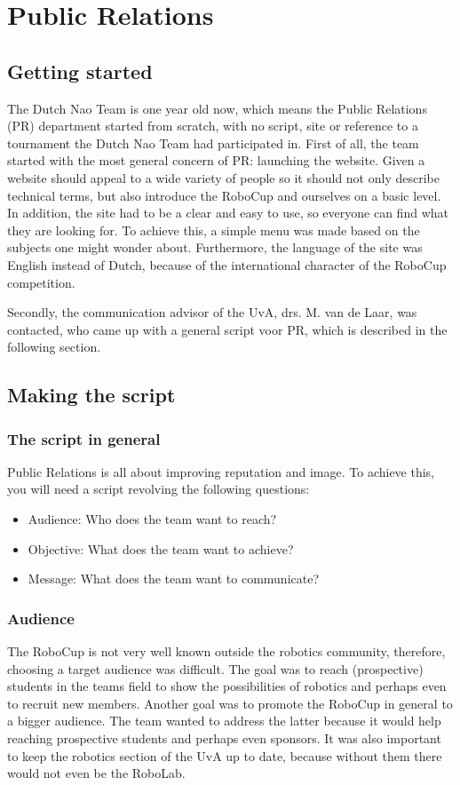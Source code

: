 \documentclass[11pt,a4paper,oneside]{article}
\begin{document}
\section{Public Relations}
\subsection{Getting started}
The Dutch Nao Team is one year old now, which means the Public Relations (PR) department started from scratch, with no script, site or reference to a tournament the Dutch Nao Team had participated in. First of all, the team started with the most general concern of PR: launching the website. Given a website should appeal to a wide variety of people so it should not only describe technical terms, but also introduce the RoboCup and ourselves on a basic level. In addition, the site had to be a clear and easy to use, so everyone can find what they are looking for. To achieve this, a simple menu was made based on the subjects one might wonder about. Furthermore, the language of the site was English instead of Dutch, because of the international character of the RoboCup competition.

Secondly, the communication advisor of the UvA, drs. M. van de Laar, was contacted, who came up with a general script voor PR, which is described in the following section.

\subsection{Making the script}
\subsubsection{The script in general}
Public Relations is all about improving reputation and image. To achieve this, you will need a script revolving the following questions:
\begin{itemize}
\item Audience: Who does the team want to reach?
\item Objective: What does the team want to achieve?
\item Message: What does the team want to communicate?
\end{itemize}

\subsubsection{Audience}
The RoboCup is not very well known outside the robotics community, therefore, choosing a target audience was difficult. The goal was to reach (prospective) students in the teams field to show the possibilities of robotics and perhaps even to recruit new members. Another goal was to promote the RoboCup in general to a bigger audience. The team wanted to address the latter because it would help reaching prospective students and perhaps even sponsors. It was also important to keep the robotics section of the UvA up to date, because without them there would not even be the RoboLab.
\end{document}
